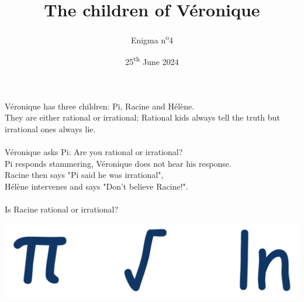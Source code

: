 \documentclass[a4paper, top=10mm]{article}
\title{\textbf{\huge{The children of Véronique}}}
\author{Enigma n\textsuperscript{o}4}
\date{25\textsuperscript{th} June 2024}
\begin{document}
	\maketitle
	
	\Large
	Véronique has three children: Pi, Racine and Hélène.\\
	They are either rational or irrational; Rational kids always tell the truth but irrational ones always lie.\\
	\\
	Véronique asks Pi: Are you rational or irrational?\\
	Pi responds stammering, Véronique does not hear his response.\\
	Racine then says "Pi said he was irrational",\\
	Hélène intervenes and says "Don’t believe Racine!".\\
	\\
	Is Racine rational or irrational?
	
	\vspace{1cm}
	
	\begin{center}
		\includegraphics[width=\linewidth]{04symbols.pdf}
	\end{center}
	
	
\end{document}

